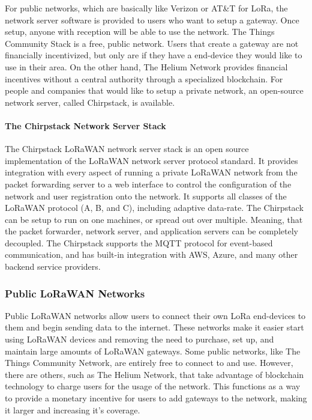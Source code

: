 For public networks, which are basically like Verizon or AT\&T for LoRa, the network server software
is provided to users who want to setup a gateway. Once setup, anyone with reception will be able to
use the network. The Things Community Stack is a free, public network. Users that create a gateway
are not financially incentivized, but only are if they have a end-device they would like to use in
their area. On the other hand, The Helium Network provides financial incentives without a central
authority through a specialized blockchain. For people and companies that would like to setup
a private network, an open-source network server, called Chirpstack, is available.


\paragraph{The Chirpstack Network Server Stack} 
The Chirpstack LoRaWAN network server stack is an open source implementation of the LoRaWAN network
server protocol standard. It provides integration with every aspect of running a private LoRaWAN
network from the packet forwarding server to a web interface to control the configuration of the
network and user registration onto the network. It supports all classes of the LoRaWAN protocol (A,
B, and C), including adaptive data-rate. The Chirpstack can be setup to run on one machines, or
spread out over multiple. Meaning, that the packet forwarder, network server, and application
servers can be completely decoupled. The Chirpstack supports the MQTT protocol for event-based
communication, and has built-in integration with AWS, Azure, and many other backend service
providers.

\subsubsection{Public LoRaWAN Networks} \label{public-networks}
Public LoRaWAN networks allow users to connect their own LoRa end-devices to them and begin sending data to the internet. These networks make it easier start using LoRaWAN devices and removing the need to purchase, set up, and maintain large amounts of LoRaWAN gateways. Some public networks, like The Things Community Network, are entirely free to connect to and use. However, there are others, such as The Helium Network, that take advantage of blockchain technology to charge users for the usage of the network. This functions as a way to provide a monetary incentive for users to add gateways to the network, making it larger and increasing it's coverage.

